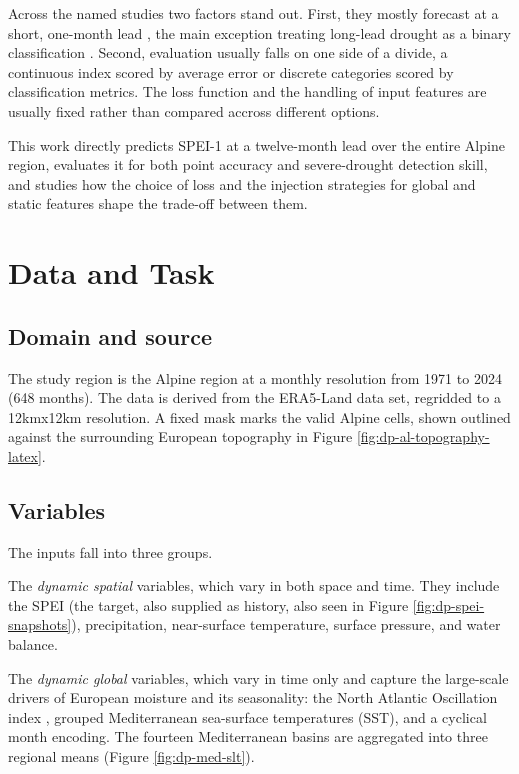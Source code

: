 \documentclass[
]{krantz}
\begin{document}
Across the named studies two factors stand out.
First, they mostly forecast at a short, one-month lead \citep{wang2023, chen2025, yu2023}, the main exception treating long-lead drought as a binary classification \citep{marusov2024}.
Second, evaluation usually falls on one side of a divide, a continuous index scored by average error or discrete categories scored by classification metrics.
The loss function and the handling of input features are usually fixed rather than compared accross different options.

This work directly predicts SPEI-1 at a twelve-month lead over the entire Alpine region, evaluates it for both point accuracy and severe-drought detection skill, and studies how the choice of loss and the injection strategies for global and static features shape the trade-off between them.

\section{Data and Task}\label{data-and-task}

\subsection{Domain and source}\label{domain-and-source}

The study region is the Alpine region at a monthly resolution from 1971 to 2024 (648 months).
The data is derived from the ERA5-Land data set, regridded to a 12kmx12km resolution.
A fixed mask marks the valid Alpine cells, shown outlined against the surrounding European topography in Figure \ref{fig:dp-al-topography-latex}.

\subsection{Variables}\label{variables}

The inputs fall into three groups.

The \emph{dynamic spatial} variables, which vary in both space and time. They include the SPEI (the target, also supplied as history, also seen in Figure \ref{fig:dp-spei-snapshots}), precipitation, near-surface temperature, surface pressure, and water balance.

The \emph{dynamic global} variables, which vary in time only and capture the large-scale drivers of European moisture and its seasonality: the North Atlantic Oscillation index \citep{hurrell1995}, grouped Mediterranean sea-surface temperatures (SST), and a cyclical month encoding.
The fourteen Mediterranean basins are aggregated into three regional means \citep{millot2005, lionello2006} (Figure \ref{fig:dp-med-slt}).
\end{document}
